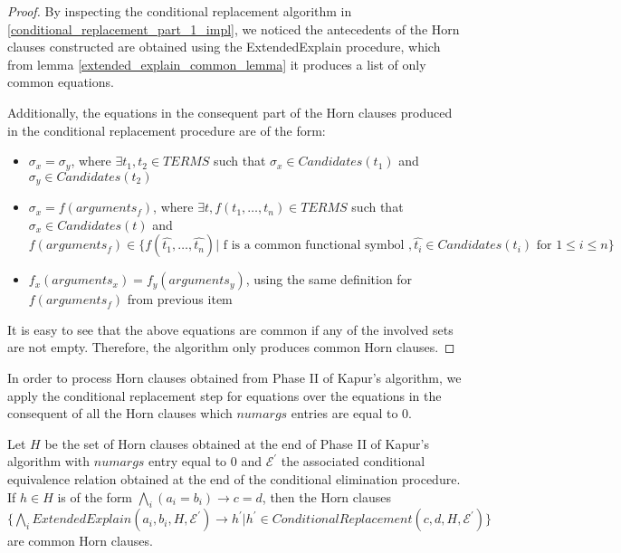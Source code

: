   \begin{proof}
    By inspecting the conditional replacement algorithm 
    in \ref{conditional_replacement_part_1_impl},
    we noticed the antecedents of the Horn clauses 
    constructed are obtained using the ExtendedExplain 
    procedure, which from lemma \ref{extended_explain_common_lemma} 
    it produces a list of only common equations.

    Additionally, the equations in the consequent part 
    of the Horn clauses produced in the conditional replacement 
    procedure are of the form:

    \begin{itemize}
      \item $\sigma_x = \sigma_y$, 
        where $\exists t_1, t_2 \in TERMS$
        such that $\sigma_x \in Candidates(t_1)$ and 
        $\sigma_y \in Candidates(t_2)$
      \item $\sigma_x = f(arguments_{f})$, 
        where $\exists t, f(t_1, \dots, t_n) \in TERMS$
        such that $\sigma_x \in Candidates(t)$ and
        $f(arguments_f) \in \{f(\hat{t_1}, \dots, \hat{t_n})
          | \text{ f is a common functional symbol },
          \hat{t_i} \in Candidates(t_i) \text{ for } 1 \leq i \leq n
        \}$
      \item $f_x(arguments_x) = f_y(arguments_y)$, using the same
        definition for $f(arguments_f)$ from previous item
    \end{itemize}

    It is easy to see that the above equations are common if any
    of the involved sets are not empty. Therefore, the algorithm 
    only produces common Horn clauses.
  \end{proof}

  In order to process Horn clauses obtained 
  from Phase II of Kapur's algorithm, we apply 
  the conditional replacement step for equations
  over the equations in the consequent of all 
  the Horn clauses which $numargs$ entries are 
  equal to 0.

  \begin{lemma}
    Let $H$ be the set of Horn clauses
    obtained at the end of Phase II of Kapur's 
    algorithm with $numargs$ entry equal to 0 
    and $\mathcal{E^{'}}$ the associated
    conditional equivalence relation obtained 
    at the end of the conditional elimination 
    procedure. 
    If $h \in H$ is of the form $\bigwedge_i (a_i = b_i) 
    \rightarrow c = d$, then the Horn clauses
    $\{\bigwedge_i ExtendedExplain(a_i, b_i, H, \mathcal{E^{'}})
      \rightarrow h^{'}  | 
      h^{'} \in 
    ConditionalReplacement(c, d, H, \mathcal{E^{'}})\}$
    are common Horn clauses.
  \end{lemma}

